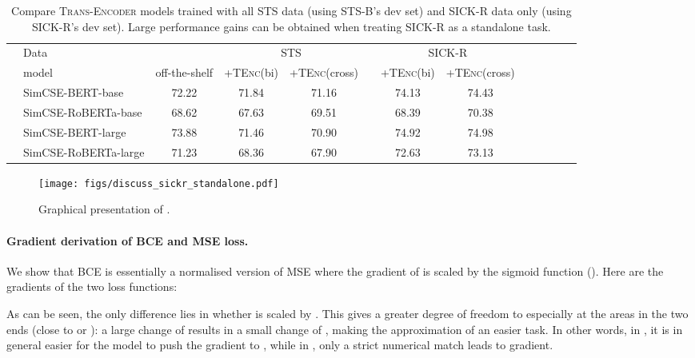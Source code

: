\documentclass{article} \usepackage{iclr2021_conference,times}
\newcommand{\modelname}{\textsc{Trans-Encoder}\xspace}
\newcommand{\tenc}{\textsc{TEnc}\xspace}
\begin{document}
\begin{table}[!t] \setlength{\tabcolsep}{3.6pt}
\centering
\small
\begin{tabular}{llccccccccccc}
\cmidrule[1.5pt]{1-10}
&  Data  & & \multicolumn{2}{c}{STS} & & \multicolumn{2}{c}{SICK-R} & \\
\cmidrule[.5pt]{4-5} \cmidrule[.5pt]{7-8}
 & model & off-the-shelf &  +\tenc (bi)  &  +\tenc (cross) & &  +\tenc (bi) & +\tenc (cross) & \\
\cmidrule[1.0pt]{1-10}  
& SimCSE-BERT-base & 72.22 & 71.84 & 71.16 & & 74.13 & 74.43 \\
& SimCSE-RoBERTa-base & 68.62 & 67.63 & 69.51 & & 68.39 & 70.38 \\
& SimCSE-BERT-large & 73.88  & 71.46 & 70.90 & & 74.92 & 74.98 \\
& SimCSE-RoBERTa-large & 71.23 & 68.36 & 67.90 & & 72.63 & 73.13 \\
\cmidrule[1.5pt]{1-10}
\end{tabular}
\caption{Compare \modelname models trained with all STS data (using STS-B's dev set) and SICK-R data only (using SICK-R's dev set). Large performance gains can be obtained when treating SICK-R as a standalone task. }
\label{tab:sickr_standalone}
\end{table}


\begin{figure}
    \centering
    \texttt{[image: figs/discuss\_sickr\_standalone.pdf]}
    \caption{Graphical presentation of .}
    \label{fig:sickr_standalone}
\end{figure}

\paragraph{Gradient derivation of BCE and MSE loss.} We show that BCE is essentially a normalised version of MSE where the gradient of  is scaled by the sigmoid function (). Here are the gradients of the two loss functions:

As can be seen, the only difference lies in whether  is scaled by . This gives a greater degree of freedom to  especially at the areas in the two ends (close to  or ): a large change of  results in a small change of , making the approximation of  an easier task. In other words, in , it is in general easier for the model to push the gradient to , while in  , only a strict numerical match leads to  gradient.
\end{document}
